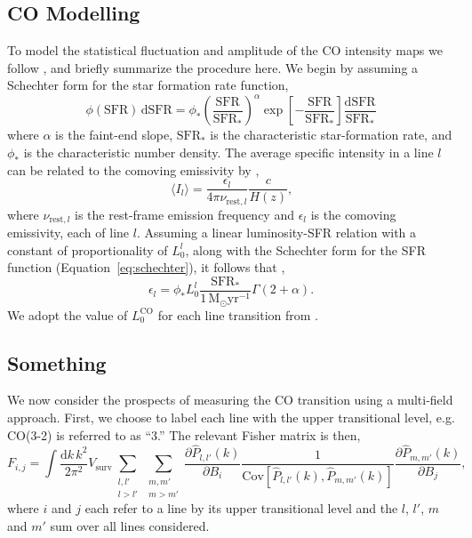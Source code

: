 \documentclass{aastex62}
\newcommand{\Msun}{\ensuremath{\text{M}_\odot}}
\newcommand{\SFR}{\ensuremath{\text{SFR}}}
\newcommand{\CO}{\ensuremath{\text{CO}}}
\newcommand{\beq}{\begin{equation}}
\newcommand{\eeq}{\end{equation}}
\newcommand{\Cov}[2]{\mathrm{Cov}[#1,#2]}
\newcommand{\avg}[1]{\ensuremath{\langle #1 \rangle}}
\begin{document}
\subsection{CO Modelling} \label{ssec:co_modelling}
To model the statistical fluctuation and amplitude of the \CO{} intensity maps
we follow \citet{2016ApJ...825..143L}, and briefly summarize the procedure
here. We begin by assuming a Schechter form for the star formation rate
function,
\beq\label{eq:schechter}
\phi(\SFR)\,\text{d}\SFR = \phi_*
\left(\frac{\SFR}{\SFR_*}\right)^{\alpha}\exp{\left[-\frac{\SFR}{\SFR_*}\right]}
\frac{\text{d}\SFR}{\SFR_*}
\eeq
where $\alpha$ is the faint-end slope, $\SFR_*$ is the characteristic
star-formation rate, and $\phi_*$ is the characteristic number density. The
average specific intensity in a line $l$ can be related to the comoving
emissivity by \citep{2011ApJ...741...70L, 2013ApJ...768...15P},
\beq\label{eq:emiss_to_int}
\avg{I_l} = \frac{\epsilon_l}{4\pi \nu_{\text{rest},l}}\frac{c}{H(z)}\text{,}
\eeq
where $\nu_{\text{rest},l}$ is the rest-frame emission frequency and
$\epsilon_l$ is the comoving emissivity, each of line $l$. Assuming a linear
luminosity-SFR relation with a constant of proportionality of $L_0^l$, along
with the Schechter form for the SFR function (Equation~\ref{eq:schechter}), it
follows that \citep{2013ApJ...768...15P},
\beq\label{eq:com_emiss}
\epsilon_l = \phi_* L_0^{l}
\frac{\SFR_*}{1\,\Msun\text{yr}^{-1}}\Gamma{(2+\alpha)}\text{.}
\eeq
We adopt the value of $L_0^{\CO}$ for each line transition from
\citet{2010JCAP...11..016V}.

\subsection{Something} \label{ssec:co_}
We now consider the prospects of measuring the \CO{} transition using a
multi-field approach. First, we choose to label each line with the upper
transitional level, e.g. CO(3-2) is referred to as ``3.'' The relevant Fisher
matrix is then,
\beq\label{eq:co_fisher}
F_{i,j} = 
\int \frac{\text{d}k\,k^2}{2\pi^2} V_{\text{surv}} 
\sum_{\substack{l,l'\\l > l'}} \sum_{\substack{m,m'\\m > m'}}
\frac{\partial \hat{P}_{l,l'}(k)}{\partial B_i}
\frac{1}{\Cov{\hat{P}_{l,l'}(k)}{\hat{P}_{m,m'}(k)}} 
\frac{\partial \hat{P}_{m,m'}(k)}{\partial B_j}\text{,}
\eeq
where $i$ and $j$ each refer to a line by its upper transitional level and the
$l$, $l'$, $m$ and $m'$ sum over all lines considered.
\end{document}
